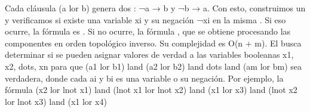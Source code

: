 {}Cada cláusula \markdownRendererDollarSign{}(a \markdownRendererBackslash{}lor b)\markdownRendererDollarSign{} genera dos : ¬a → b y ¬b → a. Con esto, construimos un  y verificamos si existe una variable \markdownRendererDollarSign{}x\markdownRendererUnderscore{}i\markdownRendererDollarSign{} y su negación ¬\markdownRendererDollarSign{}x\markdownRendererUnderscore{}i\markdownRendererDollarSign{} en la misma .\markdownRendererHardLineBreak
{}Si eso ocurre, la fórmula es . Si no ocurre, la fórmula , que se obtiene procesando las componentes en orden topológico inverso.\markdownRendererHardLineBreak
{}Su complejidad es \markdownRendererDollarSign{}O(n + m)\markdownRendererDollarSign{}.\markdownRendererInterblockSeparator
{}
\markdownRendererSectionEnd \markdownRendererSectionBegin
{}\markdownRendererInterblockSeparator
{}El  busca determinar si se pueden asignar valores de verdad a las variables booleanas \markdownRendererDollarSign{}x\markdownRendererUnderscore{}1, x\markdownRendererUnderscore{}2, \markdownRendererBackslash{}dots, x\markdownRendererUnderscore{}n\markdownRendererDollarSign{} para que\markdownRendererHardLineBreak
{}\markdownRendererDollarSign{}(a\markdownRendererUnderscore{}1 \markdownRendererBackslash{}lor b\markdownRendererUnderscore{}1) \markdownRendererBackslash{}land (a\markdownRendererUnderscore{}2 \markdownRendererBackslash{}lor b\markdownRendererUnderscore{}2) \markdownRendererBackslash{}land \markdownRendererBackslash{}dots \markdownRendererBackslash{}land (a\markdownRendererUnderscore{}m \markdownRendererBackslash{}lor b\markdownRendererUnderscore{}m)\markdownRendererDollarSign{} sea verdadera, donde cada \markdownRendererDollarSign{}a\markdownRendererUnderscore{}i\markdownRendererDollarSign{} y \markdownRendererDollarSign{}b\markdownRendererUnderscore{}i\markdownRendererDollarSign{} es una variable o su negación.\markdownRendererParagraphSeparator
{}Por ejemplo, la fórmula\markdownRendererHardLineBreak
{}\markdownRendererDollarSign{}\markdownRendererDollarSign{}(x\markdownRendererUnderscore{}2 \markdownRendererBackslash{}lor \markdownRendererBackslash{}lnot x\markdownRendererUnderscore{}1) \markdownRendererBackslash{}land (\markdownRendererBackslash{}lnot x\markdownRendererUnderscore{}1 \markdownRendererBackslash{}lor \markdownRendererBackslash{}lnot x\markdownRendererUnderscore{}2) \markdownRendererBackslash{}land (x\markdownRendererUnderscore{}1 \markdownRendererBackslash{}lor x\markdownRendererUnderscore{}3) \markdownRendererBackslash{}land (\markdownRendererBackslash{}lnot x\markdownRendererUnderscore{}2 \markdownRendererBackslash{}lor \markdownRendererBackslash{}lnot x\markdownRendererUnderscore{}3) \markdownRendererBackslash{}land (x\markdownRendererUnderscore{}1 \markdownRendererBackslash{}lor x\markdownRendererUnderscore{}4)\markdownRendererDollarSign{}\markdownRendererDollarSign{}\markdownRendererHardLineBreak

